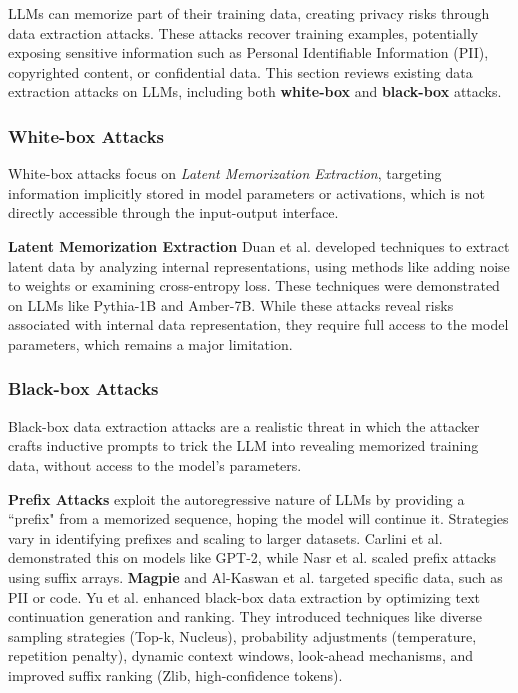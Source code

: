 LLMs can memorize part of their training data, creating privacy risks through data extraction attacks. These attacks recover training examples, potentially exposing sensitive information such as Personal Identifiable Information (PII), copyrighted content, or confidential data. This section reviews existing data extraction attacks on LLMs, including both \textbf{white-box} and \textbf{black-box} attacks.

\subsubsection{White-box Attacks}
White-box attacks focus on \emph{Latent Memorization Extraction}, targeting information implicitly stored in model parameters or activations, which is not directly accessible through the input-output interface.

\textbf{Latent Memorization Extraction} 
Duan et al. \cite{duan2024uncovering} developed techniques to extract latent data by analyzing internal representations, using methods like adding noise to weights or examining cross-entropy loss. These techniques were demonstrated on LLMs like Pythia-1B and Amber-7B. While these attacks reveal risks associated with internal data representation, they require full access to the model parameters, which remains a major limitation.

\subsubsection{Black-box Attacks}
Black-box data extraction attacks are a realistic threat in which the attacker crafts inductive prompts to trick the LLM into revealing memorized training data, without access to the model's parameters.

\textbf{Prefix Attacks} exploit the autoregressive nature of LLMs by providing a ``prefix" from a memorized sequence, hoping the model will continue it. Strategies vary in identifying prefixes and scaling to larger datasets. Carlini et al. \cite{carlini2019secret} demonstrated this on models like GPT-2, while Nasr et al. \cite{nasr2023scalable} scaled prefix attacks using suffix arrays. \textbf{Magpie} \cite{xu2024magpie} and Al-Kaswan et al. \cite{al2024traces} targeted specific data, such as PII or code.
Yu et al. \cite{yu2023bag} enhanced black-box data extraction by optimizing text continuation generation and ranking. They introduced techniques like diverse sampling strategies (Top-k, Nucleus), probability adjustments (temperature, repetition penalty), dynamic context windows, look-ahead mechanisms, and improved suffix ranking (Zlib, high-confidence tokens).

